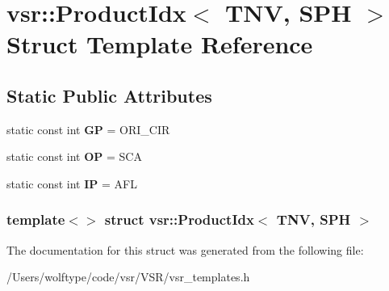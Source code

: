 \hypertarget{structvsr_1_1_product_idx_3_01_t_n_v_00_01_s_p_h_01_4}{\section{vsr\-:\-:Product\-Idx$<$ T\-N\-V, S\-P\-H $>$ Struct Template Reference}
\label{structvsr_1_1_product_idx_3_01_t_n_v_00_01_s_p_h_01_4}
}
\subsection*{Static Public Attributes}
\begin{DoxyCompactItemize}
\item 
\hypertarget{structvsr_1_1_product_idx_3_01_t_n_v_00_01_s_p_h_01_4_a3fb69e7a5596bafa3f894ffe3ea3405d}{static const int {\bfseries G\-P} = O\-R\-I\-\_\-\-C\-I\-R}\label{structvsr_1_1_product_idx_3_01_t_n_v_00_01_s_p_h_01_4_a3fb69e7a5596bafa3f894ffe3ea3405d}

\item 
\hypertarget{structvsr_1_1_product_idx_3_01_t_n_v_00_01_s_p_h_01_4_aeb8e84f336fab3f281878ee9c587a75e}{static const int {\bfseries O\-P} = S\-C\-A}\label{structvsr_1_1_product_idx_3_01_t_n_v_00_01_s_p_h_01_4_aeb8e84f336fab3f281878ee9c587a75e}

\item 
\hypertarget{structvsr_1_1_product_idx_3_01_t_n_v_00_01_s_p_h_01_4_a79e5bf294d220c254c95e8905808f913}{static const int {\bfseries I\-P} = A\-F\-L}\label{structvsr_1_1_product_idx_3_01_t_n_v_00_01_s_p_h_01_4_a79e5bf294d220c254c95e8905808f913}

\end{DoxyCompactItemize}
\subsubsection*{template$<$$>$ struct vsr\-::\-Product\-Idx$<$ T\-N\-V, S\-P\-H $>$}



The documentation for this struct was generated from the following file\-:\begin{DoxyCompactItemize}
\item 
/\-Users/wolftype/code/vsr/\-V\-S\-R/vsr\-\_\-templates.\-h\end{DoxyCompactItemize}
